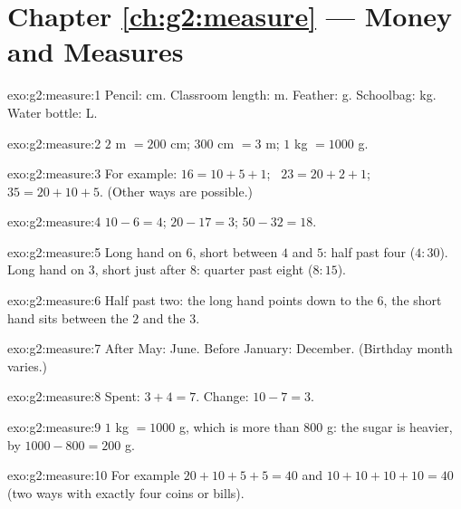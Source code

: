 \section*{Chapter \ref{ch:g2:measure} --- Money and Measures}

\begin{solution}{exo:g2:measure:1}
Pencil: cm. Classroom length: m. Feather: g. Schoolbag: kg. Water
bottle: L.
\end{solution}

\begin{solution}{exo:g2:measure:2}
$2$ m $= 200$ cm; \quad $300$ cm $= 3$ m; \quad $1$ kg $= 1000$ g.
\end{solution}

\begin{solution}{exo:g2:measure:3}
For example: $16 = 10 + 5 + 1$; \ $23 = 20 + 2 + 1$; \
$35 = 20 + 10 + 5$. (Other ways are possible.)
\end{solution}

\begin{solution}{exo:g2:measure:4}
$10 - 6 = 4$; \quad $20 - 17 = 3$; \quad $50 - 32 = 18$.
\end{solution}

\begin{solution}{exo:g2:measure:5}
Long hand on $6$, short between $4$ and $5$: half past four
($4{:}30$). Long hand on $3$, short just after $8$: quarter past
eight ($8{:}15$).
\end{solution}

\begin{solution}{exo:g2:measure:6}
Half past two: the long hand points down to the $6$, the short hand
sits between the $2$ and the $3$.
\end{solution}

\begin{solution}{exo:g2:measure:7}
After May: June. Before January: December. (Birthday month varies.)
\end{solution}

\begin{solution}{exo:g2:measure:8}
Spent: $3 + 4 = 7$. Change: $10 - 7 = 3$.
\end{solution}

\begin{solution}{exo:g2:measure:9}
$1$ kg $= 1000$ g, which is more than $800$ g: the sugar is
heavier, by $1000 - 800 = 200$ g.
\end{solution}

\begin{solution}{exo:g2:measure:10}
For example $20 + 10 + 5 + 5 = 40$ and $10 + 10 + 10 + 10 = 40$
(two ways with exactly four coins or bills).
\end{solution}
